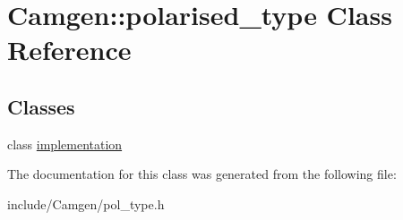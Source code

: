 \hypertarget{a00433}{}\section{Camgen\+:\+:polarised\+\_\+type Class Reference}
\label{a00433}
\subsection*{Classes}
\begin{DoxyCompactItemize}
\item 
class \hyperlink{a00298}{implementation}
\end{DoxyCompactItemize}


The documentation for this class was generated from the following file\+:\begin{DoxyCompactItemize}
\item 
include/\+Camgen/pol\+\_\+type.\+h\end{DoxyCompactItemize}
